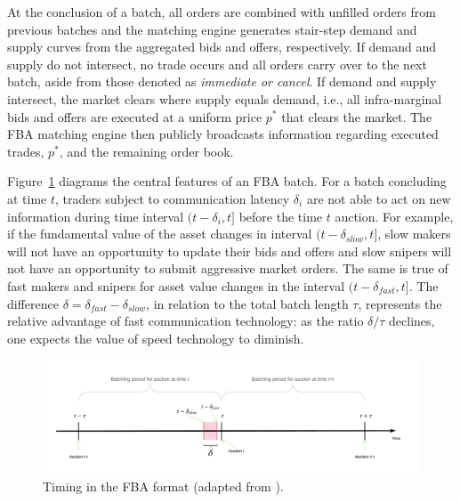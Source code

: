 \documentclass[12pt]{article}
\begin{document}
At the conclusion of a batch, all orders are combined with unfilled orders from previous batches and the matching engine generates stair-step demand and supply curves from the aggregated bids and offers, respectively. If demand and supply do not intersect, no trade occurs and all orders carry over to the next batch, aside from those denoted as \textit{immediate or cancel}. If demand and supply intersect, the market clears where supply equals demand, i.e., all infra-marginal bids and offers are executed at a uniform price $p^*$ that clears the market. The FBA matching engine then publicly broadcasts information regarding executed trades, $p^*$, and the remaining order book.

Figure~\ref{fig:fbaDiagram} diagrams the central features of an FBA batch. For a batch concluding at time $t$, traders subject to communication latency $\delta_i$ are not able to act on new information during time interval $(t-\delta_i,t]$ before the time $t$ auction. For example, if the fundamental value of the asset changes in interval $(t-\delta_{slow},t]$, slow makers will not have an opportunity to update their bids and offers and slow snipers will not have an opportunity to submit aggressive market orders. The same is true of fast makers and snipers for asset value changes in the interval $(t-\delta_{fast},t]$. The difference $\delta = \delta_{fast}-\delta_{slow}$, in relation to the total batch length $\tau$, represents the relative advantage of fast communication technology: as the ratio $\delta/\tau$ declines, one expects the value of speed technology to diminish.

\begin{figure}
\centering
\includegraphics[width=\textwidth]{img/timing_FBA.png}
\caption{\label{fig:FBAtiming}Timing in the FBA format (adapted from \cite{Budish2015}).}
\label{fig:fbaDiagram}
\end{figure}
\end{document}
